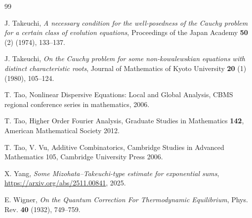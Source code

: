 \documentclass[11pt,reqno]{amsart}
\numberwithin{equation}{section}
\begin{document}
\begin{thebibliography}{99}

 J. Takeuchi, \textit{A necessary condition for the well-posedness of the Cauchy problem for a certain class of evolution equations}, Proceedings of the Japan Academy \textbf{50} (2) (1974), 133--137.

 J. Takeuchi, \textit{On the Cauchy problem for some non-kowalewskian equations with distinct characteristic roots}, Journal of Mathematics of Kyoto University \textbf{20} (1) (1980), 105--124.

 T. Tao, Nonlinear Dispersive Equations: Local and Global Analysis, CBMS regional conference series in mathematics, 2006.

 T. Tao, Higher Order Fourier Analysis, Graduate Studies in Mathematics \textbf{142}, American Mathematical Society 2012.

 T. Tao, V. Vu, Additive Combinatorics, Cambridge Studies in Advanced Mathematics 105, Cambridge University Press 2006.



 X. Yang, \textit{Some Mizohata--Takeuchi-type estimate for exponential sums}, \url{https://arxiv.org/abs/2511.00841}, 2025.


 E. Wigner, \textit{On the Quantum Correction For Thermodynamic Equilibrium}, Phys. Rev. \textbf{40} (1932), 749--759.

\end{thebibliography}
\end{document}

